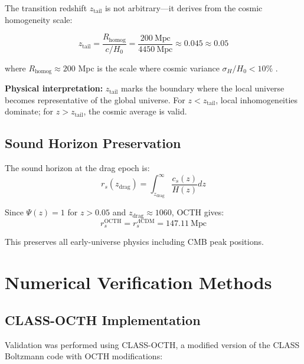\documentclass[12pt,a4paper]{article}
\begin{document}
The transition redshift $z_{\text{tail}}$ is not arbitrary---it derives from the cosmic homogeneity scale:

\begin{equation}
z_{\text{tail}} = \frac{R_{\text{homog}}}{c/H_0} = \frac{200~\text{Mpc}}{4450~\text{Mpc}} \approx 0.045 \approx 0.05
\label{eq:z_tail_derivation}
\end{equation}

where $R_{\text{homog}} \approx 200$ Mpc is the scale where cosmic variance $\sigma_H/H_0 < 10\%$ \citep{Scrimgeour2012}.

\textbf{Physical interpretation:} $z_{\text{tail}}$ marks the boundary where the local universe becomes representative of the global universe. For $z < z_{\text{tail}}$, local inhomogeneities dominate; for $z > z_{\text{tail}}$, the cosmic average is valid.

\subsection{Sound Horizon Preservation}

The sound horizon at the drag epoch is:
\begin{equation}
r_s(z_{\text{drag}}) = \int_{z_{\text{drag}}}^{\infty} \frac{c_s(z)}{H(z)} dz
\label{eq:rs}
\end{equation}

Since $\Psi(z) = 1$ for $z > 0.05$ and $z_{\text{drag}} \approx 1060$, OCTH gives:
\begin{equation}
r_s^{\text{OCTH}} = r_s^{\Lambda\text{CDM}} = 147.11~\text{Mpc}
\end{equation}

This preserves all early-universe physics including CMB peak positions.

\section{Numerical Verification Methods}

\subsection{CLASS-OCTH Implementation}

Validation was performed using CLASS-OCTH, a modified version of the CLASS Boltzmann code \citep{CLASS2011} with OCTH modifications:
\end{document}
